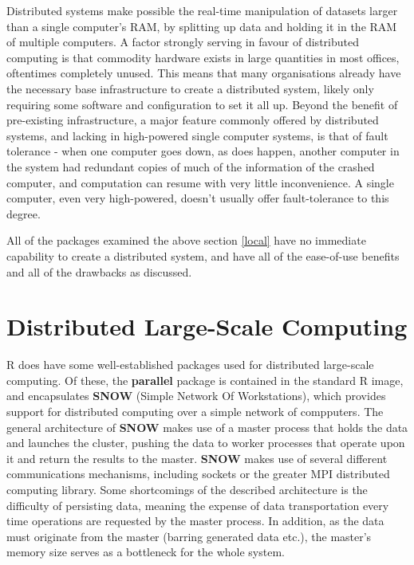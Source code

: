 Distributed systems make possible the real-time manipulation of datasets larger than a single computer's RAM, by splitting up data and holding it in the RAM of multiple computers.
A factor strongly serving in favour of distributed computing is that commodity hardware exists in large quantities in most offices, oftentimes completely unused.
This means that many organisations already have the necessary base infrastructure to create a distributed system, likely only requiring some software and configuration to set it all up.
Beyond the benefit of pre-existing infrastructure, a major feature commonly offered by distributed systems, and lacking in high-powered single computer systems, is that of fault tolerance - when one computer goes down, as does happen, another computer in the system had redundant copies of much of the information of the crashed computer, and computation can resume with very little inconvenience.
A single computer, even very high-powered, doesn't usually offer fault-tolerance to this degree.

All of the packages examined the above section \ref{local} have no immediate capability to create a distributed system, and have all of the ease-of-use benefits and all of the drawbacks as discussed.

\section{Distributed Large-Scale Computing}

R does have some well-established packages used for distributed large-scale computing.
Of these, the \textbf{parallel} package is contained in the standard R image, and encapsulates \textbf{SNOW} (Simple Network Of Workstations), which provides support for distributed computing over a simple network of compputers.
The general architecture of \textbf{SNOW} makes use of a master process that holds the data and launches the cluster, pushing the data to worker processes that operate upon it and return the results to the master. \textbf{SNOW} makes use of several different communications mechanisms, including sockets or the greater MPI distributed computing library.
Some shortcomings of the described architecture is the difficulty of persisting data, meaning the expense of data transportation every time operations are requested by the master process.
In addition, as the data must originate from the master (barring generated data etc.), the master's memory size serves as a bottleneck for the whole system.\\

